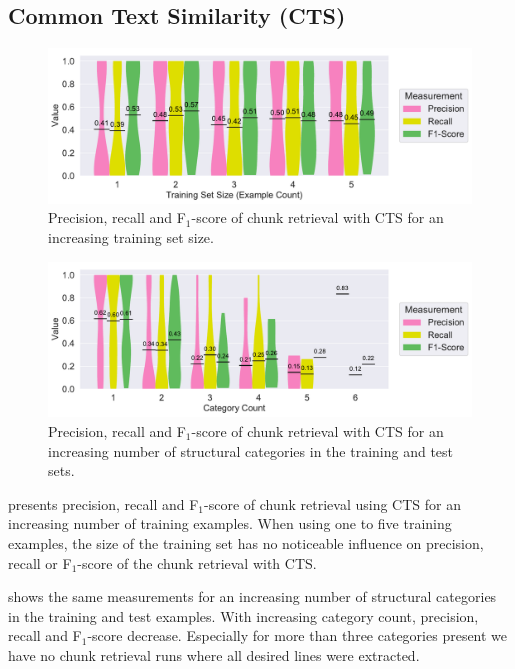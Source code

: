 \newpage
\subsection{Common Text Similarity (CTS)}

\begin{figure}[!t]
		\centering
		\includegraphics[width=\columnwidth, clip]{img/big-study/recall-precision-examplecount-CTS.pdf}
		\caption{Precision, recall and F$_{1}$-score of chunk retrieval with CTS for an increasing training set size.}
		\label{fig:recall-precision-examplecount-CTS}
\end{figure}

\begin{figure}[!t]
		\centering
		\includegraphics[width=\columnwidth, clip]{img/big-study/recall-precision-categorycount-CTS.pdf}
		\caption{Precision, recall and F$_{1}$-score of chunk retrieval with CTS for an increasing number of structural categories in the training and test sets.}
		\label{fig:recall-precision-categorycount-CTS}
\end{figure}

 presents precision, recall and F$_{1}$-score of chunk retrieval using CTS for an increasing number of training examples.
When using one to five training examples, the size of the training set has no noticeable influence on precision, recall or F$_{1}$-score of the chunk retrieval with CTS.

 shows the same measurements for an increasing number of structural categories in the training and test examples.
With increasing category count, precision, recall and F$_{1}$-score decrease.
Especially for more than three categories present we have no chunk retrieval runs where all desired lines were extracted.


